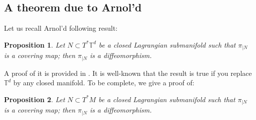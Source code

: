 \documentclass{dcds}
\newtheorem{proposition}{Proposition}
\theoremstyle{definition}
\begin{document}
\subsection{A theorem due to Arnol'd}

Let us recall Arnol'd following result:
\begin{proposition}
Let $N\subset  T^*{\mathbb {T}}^d$ be a closed Lagrangian submanifold such that $\pi_{|N}$ is a covering map; then $\pi_{|N}$ is a diffeomorphism.
\end{proposition}
 A proof of it is provided in \cite{He1}. It is well-known that the result is true if you replace ${\mathbb {T}}^d$ by any closed manifold. To be complete, we give a proof of:

 \begin{proposition}\label{P3}
Let $N\subset  T^*M$ be a closed Lagrangian submanifold such that $\pi_{|N}$ is a covering map; then $\pi_{|N}$ is a diffeomorphism.
\end{proposition}
\end{document}
